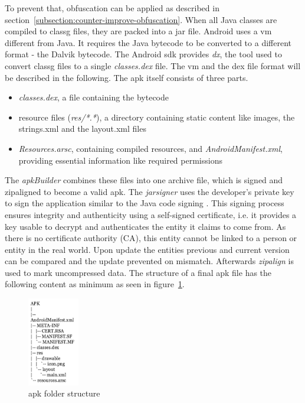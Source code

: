 To prevent that, obfuscation can be applied as described in section~\ref{subsection:counter-improve-obfuscation}.
When all Java classes are compiled to \gls{classg} files, they are packed into a \gls{jar} file.
\newline
Android uses a \gls{vm} different from Java.
It requires the Java bytecode to be converted to a different format - the Dalvik bytecode.
The Android \gls{sdk} provides \textit{dx}, the tool used to convert \gls{classg} files to a single \textit{classes.dex} file.
The \gls{vm} and the \gls{dex} file format will be described in the following.
\newpage
The \gls{apk} itself consists of three parts.
\begin{itemize}
\item \textit{classes.dex}, a file containing the bytecode
\item resource files (\textit{res/*.*}), a directory containing static content like images, the strings.xml and the layout.xml files
\item \textit{Resources.arsc}, containing compiled resources, and \textit{AndroidManifest.xml}, providing essential information like required permissions
\end{itemize}
The \textit{apkBuilder} combines these files into one archive file, which is signed and zipaligned to become a valid \gls{apk}.
The \textit{jarsigner} uses the developer’s private key to sign the application similar to the Java code signing \cite{codeSigning}.
This signing process ensures integrity and authenticity using a self-signed certificate, i.e. it provides a key usable to decrypt and authenticates the entity it claims to come from.
As there is no certificate authority (CA), this entity cannot be linked to a person or entity in the real world.
Upon update the entities previous and current version can be compared and the update prevented on mismatch. \cite{nelenkovSelf}
Afterwards \textit{zipalign} is used to mark uncompressed data. \cite{androidPublishSign} \cite{androidSigning} \cite{andevconDalvikART}
\newline
The structure of a final \gls{apk} file has the following content as minimum as seen in figure~\ref{fig:apkfolder}.
\begin{figure}[h]
    \centering
    \includegraphics[width=0.2\textwidth]{data/apkfolder.png}
    \caption{\gls{apk} folder structure}
    \label{fig:apkfolder}
\end{figure}
